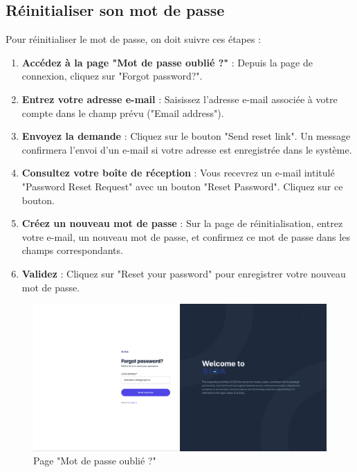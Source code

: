 \subsection{Réinitialiser son mot de passe}
Pour réinitialiser le mot de passe, on doit suivre ces étapes :
\begin{enumerate}
    \item \textbf{Accédez à la page "Mot de passe oublié ?"} : Depuis la page de connexion, cliquez sur "Forgot password?".
    \item \textbf{Entrez votre adresse e-mail} : Saisissez l'adresse e-mail associée à votre compte dans le champ prévu ("Email address").
    \item \textbf{Envoyez la demande} : Cliquez sur le bouton "Send reset link". Un message confirmera l'envoi d'un e-mail si votre adresse est enregistrée dans le système.
    \item \textbf{Consultez votre boîte de réception} : Vous recevrez un e-mail intitulé "Password Reset Request" avec un bouton "Reset Password". Cliquez sur ce bouton.
    \newpage
    \vspace*{-2cm}
    \item \textbf{Créez un nouveau mot de passe} : Sur la page de réinitialisation, entrez votre e-mail, un nouveau mot de passe, et confirmez ce mot de passe dans les champs correspondants.
    \item \textbf{Validez} : Cliquez sur "Reset your password" pour enregistrer votre nouveau mot de passe.
\end{enumerate}
\begin{figure}[h]
    \centering
    \includegraphics[width=16cm]{images/realisation/reset1.png}
    \caption{Page "Mot de passe oublié ?"}
    \label{fig:forgot_password}
\end{figure}
